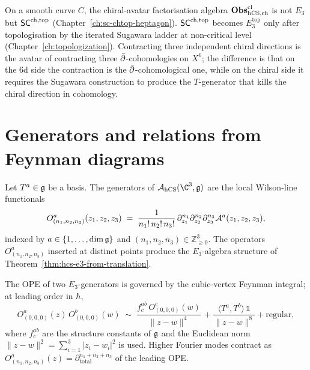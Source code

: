 \begin{remark}
\label{rem:chiral-avatar-e3}
On a smooth curve $C$, the chiral-avatar factorisation algebra
$\mathbf{Obs}^{\mathrm{cl}}_{\mathrm{hCS},\mathrm{ch}}$ is not $E_3$ but
$\mathsf{SC}^{\mathrm{ch},\mathrm{top}}$ (Chapter~\ref{ch:sc-chtop-heptagon}).
$\mathsf{SC}^{\mathrm{ch},\mathrm{top}}$ becomes $E_3^{\mathrm{top}}$ only after topologisation by
the iterated Sugawara ladder at non-critical level
(Chapter~\ref{ch:topologization}). Contracting three
independent chiral directions is the avatar of contracting
three $\bar\partial$-cohomologies on $X^6$; the difference is that on the
6d side the contraction is the $\bar\partial$-cohomological one, while on the
chiral side it requires the Sugawara construction to produce the
$T$-generator that kills the chiral direction in cohomology.
\end{remark}

\section{Generators and relations from Feynman diagrams}
\label{sec:hcs-generators-relations}

\begin{definition}
\label{def:e3-generators}
%
Let $T^a\in\mathfrak{g}$ be a basis. The generators of $\cA_{\hCS}(\C^3,\fg)$
are the local Wilson-line functionals
\begin{equation}
 O^a_{(n_1,n_2,n_3)}(z_1,z_2,z_3)
 \;=\; \frac{1}{n_1!\,n_2!\,n_3!}\,
 \partial_{z_1}^{n_1}\partial_{z_2}^{n_2}\partial_{z_3}^{n_3}
 \mathcal{A}^a(z_1,z_2,z_3),
\end{equation}
indexed by $a \in \{1,\ldots,\dim\mathfrak{g}\}$ and
$(n_1,n_2,n_3)\in\mathbb{Z}_{\ge 0}^3$. The operators
$O^a_{(n_1,n_2,n_3)}$ inserted at distinct points produce the
$E_3$-algebra structure of
Theorem~\ref{thm:hcs-e3-from-translation}.
\end{definition}

\begin{theorem}
\label{thm:hcs-ope-relations}
%
The OPE of two $E_3$-generators is governed by the
cubic-vertex Feynman integral; at leading order in $\hbar$,
\begin{equation}
\label{eq:hcs-ope-leading}
 O^a_{(0,0,0)}(z)\,O^b_{(0,0,0)}(w)
 \;\sim\;
	 \frac{f^{ab}_c\,O^c_{(0,0,0)}(w)}
	 {\|z-w\|^{4}}\,
	 + \frac{\langle T^a,T^b\rangle\,\mathbb{1}}
	 {\|z-w\|^{8}}
	 + \mathrm{regular},
\end{equation}
where $f^{ab}_c$ are the structure constants of $\mathfrak{g}$ and the
Euclidean norm $\|z-w\|^2 = \sum_{i=1}^3|z_i-w_i|^2$ is used.
Higher
Fourier modes contract as
$O^a_{(n_1,n_2,n_3)}(z) = \partial^{n_1+n_2+n_3}_{\text{total}}$ of
the leading OPE.
\end{theorem}

